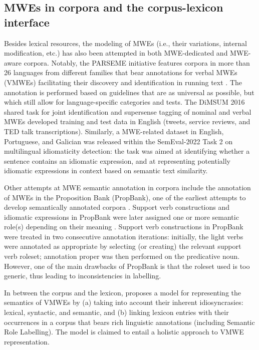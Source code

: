 \documentclass[output=paper,colorlinks,citecolor=brown]{langscibook}
\begin{document}
\subsection{MWEs in corpora and the corpus-lexicon interface}
\label{subsec:MWEs-in-corpora}
Besides lexical resources, the modeling of MWEs (i.e., their variations, internal modification, etc.) has also been attempted in both MWE-dedicated and MWE-aware corpora. Notably, the PARSEME initiative features corpora in more than 26 languages from different families that bear annotations for verbal MWEs (VMWEs) facilitating their discovery and identification in running text \citep{savary_etal_2017, ramisch_etal_2018, ramisch_etal_2020, savary_etal_2023}. The annotation is performed based on guidelines that are as universal as possible, but which still allow for language-specific categories and tests. The DiMSUM 2016 shared task for joint identification and supersense tagging of nominal and verbal MWEs \citep{schneider_etal_2016} developed training and test data in English (tweets, service reviews, and TED talk transcriptions). Similarly, a MWE-related dataset in English, Portuguese, and Galician was released within the SemEval-2022 Task 2 \citep{tayyar_madabushi_etal_2022} on multilingual idiomaticity detection: the task was aimed at identifying whether a sentence contains an idiomatic expression, and at representing potentially \mbox{idiomatic} expressions in context based on semantic text similarity.

Other attempts at MWE semantic annotation in corpora include the annotation of MWEs in the Proposition Bank (PropBank), one of the earliest attempts to develop semantically annotated corpora \citep{palmer_etal_2005}. Support verb constructions and idiomatic expressions in PropBank were later assigned one or more semantic role(s) depending on their meaning \citep{bonial_propbank_2014, bonial_etal_2014}. Support verb constructions in PropBank were treated in two consecutive annotation iterations: initially, the light verbs were annotated as appropriate by selecting (or creating) the relevant support verb roleset; annotation proper was then performed on the predicative noun. However, one of the main drawbacks of PropBank is that the roleset used is too generic, thus leading to inconsistencies in labelling.

In between the corpus and the lexicon, \citet{Giouli.2023} proposes a model for representing the semantics of VMWEs by (a) taking into account their inherent idiosyncrasies: lexical, syntactic, and semantic, and (b) linking lexicon entries with their occurrences in a corpus that bears rich linguistic annotations (including Semantic Role Labelling). The model is claimed to entail a holistic approach to VMWE representation.
\end{document}
